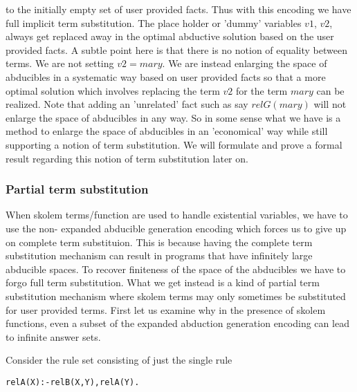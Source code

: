 to the initially empty set of user provided facts. Thus with this encoding we
have full implicit term substitution. The place holder or 'dummy' variables
$v1$, $v2$, always get replaced away in the optimal abductive solution based
on the user provided facts.
A subtle point here is that there is no notion of
equality between terms. We are not setting $v2 = mary$. We are instead
enlarging the space of abducibles in a systematic way based on user provided
facts so that a more optimal solution which involves replacing the term $v2$
for the term $mary$ can be realized. Note that adding an 'unrelated' fact such
as say $relG(mary)$ will not enlarge the space of abducibles in any way. So in
some sense what we have is a method to enlarge the space of abducibles in an
'economical' way while still supporting a notion of term substitution. We will
formulate and prove a formal result regarding this notion of term substitution
later on.

\subsubsection{Partial term substitution}

When skolem terms/function are used to handle existential variables, we have
to use the non- expanded abducible generation encoding which forces us to give
up on complete term substituion.  This is because having the complete term
substitution mechanism can result in programs that have infinitely large
abducible spaces. To recover finiteness of the space of the abducibles we have
to forgo full term substitution. What we get instead is a kind of partial term
substitution mechanism where skolem terms may only sometimes be substituted
for user provided terms.  First let us examine why in the presence of skolem
functions, even a subset of the expanded abduction generation encoding can
lead to infinite answer sets.

Consider the rule set consisting of just the single rule 
\begin{verbatim}
relA(X):-relB(X,Y),relA(Y).
\end{verbatim}

